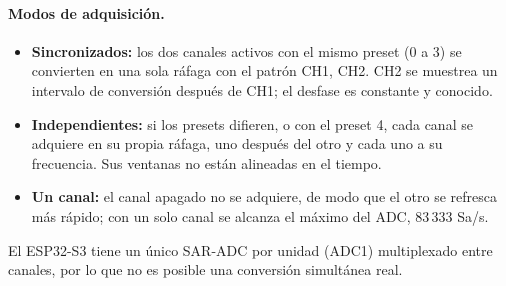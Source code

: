 \documentclass[12pt,a4paper]{article}
\begin{document}
\paragraph{Modos de adquisición.}
\begin{itemize}
  \item \textbf{Sincronizados:} los dos canales activos con el mismo preset (0 a 3) se convierten en una sola ráfaga con el patrón CH1, CH2. CH2 se muestrea un intervalo de conversión después de CH1; el desfase es constante y conocido.
  \item \textbf{Independientes:} si los presets difieren, o con el preset 4, cada canal se adquiere en su propia ráfaga, uno después del otro y cada uno a su frecuencia. Sus ventanas no están alineadas en el tiempo.
  \item \textbf{Un canal:} el canal apagado no se adquiere, de modo que el otro se refresca más rápido; con un solo canal se alcanza el máximo del ADC, 83\,333 Sa/s.
\end{itemize}

El ESP32-S3 tiene un único SAR-ADC por unidad (ADC1) multiplexado entre canales, por lo que no es posible una conversión simultánea real.
\end{document}
